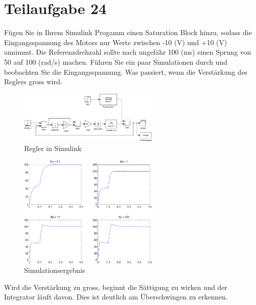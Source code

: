 \section{Teilaufgabe 24}
\begin{aufgabe}
    Fügen Sie in Ihrem Simulink Progamm einen Saturation Block hinzu, sodass 
    die Eingangsspannung des Motors nur Werte zwischen -10 (V) und +10 (V) 
    annimmt.  Die Referenzdrehzahl sollte nach ungefähr 100 (ms) einen Sprung 
    von 50 auf 100 (rad/s) machen. Führen Sie ein paar Simulationen durch und 
    beobachten Sie die Eingangsspannung. Was passiert, wenn die Verstärkung 
    des Reglers gross wird.
\end{aufgabe}
\begin{figure}[h!]
    \centering
    \includegraphics[width=0.6\textwidth]{24/regler_sat.pdf}
    \caption{Regler in Simulink}
    \label{fig:24}
\end{figure}
\begin{figure}[h!]
    \centering
    \includegraphics[width=0.6\textwidth]{24/regler_sat_plot.pdf}
    \caption{Simulationsergebnis}
    \label{fig:24plot}
\end{figure}

Wird die Verstärkung zu gross, beginnt die Sättigung zu wirken und der 
Integrator läuft davon. Dies ist deutlich am Überschwingen zu erkennen. 
